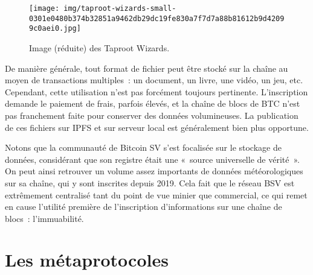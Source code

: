 \begin{figure}[h]
  \centering
  \texttt{[image: img/taproot-wizards-small-0301e0480b374b32851a9462db29dc19fe830a7f7d7a88b81612b9d42099c0aei0.jpg]}
  \caption{Image (réduite) des Taproot Wizards.}
  \label{fig:taproot-wizards}
\end{figure}

De manière générale, tout format de fichier peut être stocké sur la chaîne au moyen de transactions multiples~: un document, un livre, une vidéo, un jeu, etc. Cependant, cette utilisation n'est pas forcément toujours pertinente. L'inscription demande le paiement de frais, parfois élevés, et la chaîne de blocs de BTC n'est pas franchement faite pour conserver des données volumineuses. La publication de ces fichiers sur IPFS et sur serveur local est généralement bien plus opportune.

Notons que la communauté de Bitcoin SV s'est focalisée sur le stockage de données, considérant que son registre était une «~source universelle de vérité~». On peut ainsi retrouver un volume assez importants de données météorologiques sur sa chaîne, qui y sont inscrites depuis 2019. Cela fait que le réseau BSV est extrêmement centralisé tant du point de vue minier que commercial, ce qui remet en cause l'utilité première de l'inscription d'informations sur une chaîne de blocs~: l'immuabilité.

\section*{Les métaprotocoles}

